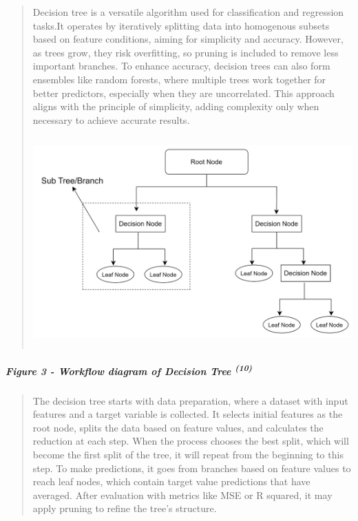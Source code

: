 \documentclass[
]{article}
\begin{document}
\begin{quote}
Decision tree is a versatile algorithm used for classification and
regression tasks.It operates by iteratively splitting data into
homogenous subsets based on feature conditions, aiming for simplicity
and accuracy. However, as trees grow, they risk overfitting, so pruning
is included to remove less important branches. To enhance accuracy,
decision trees can also form ensembles like random forests, where
multiple trees work together for better predictors, especially when they
are uncorrelated. This approach aligns with the principle of simplicity,
adding complexity only when necessary to achieve accurate results.

\includegraphics[width=5.27726in,height=3.17228in]{vertopal_f239f640fefe43bb8bc0698cafd57825/media/image13.png}
\end{quote}

\hypertarget{figure-3---workflow-diagram-of-decision-tree-10}{%
\subparagraph{\texorpdfstring{\textbf{Figure 3} - Workflow diagram of
Decision Tree
\textsuperscript{(10)}}{Figure 3 - Workflow diagram of Decision Tree (10)}}\label{figure-3---workflow-diagram-of-decision-tree-10}}

\begin{quote}
The decision tree starts with data preparation, where a dataset with
input features and a target variable is collected. It selects initial
features as the root node, splits the data based on feature values, and
calculates the reduction at each step. When the process chooses the best
split, which will become the first split of the tree, it will repeat
from the beginning to this step. To make predictions, it goes from
branches based on feature values to reach leaf nodes, which contain
target value predictions that have averaged. After evaluation with
metrics like MSE or R squared, it may apply pruning to refine the tree's
structure.
\end{quote}
\end{document}
